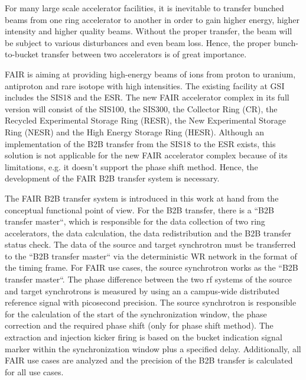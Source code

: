 For many large scale accelerator facilities, it is inevitable to transfer bunched beams from one ring accelerator to another in order to gain higher energy, higher intensity and higher quality beams. Without the proper transfer, the beam will be subject to various disturbances and even beam loss. Hence, the proper bunch-to-bucket transfer between two accelerators is of great importance. 

FAIR is aiming at providing high-energy beams of ions from proton to uranium, antiproton and rare isotope with high intensities. The existing facility at GSI includes the SIS18 and the ESR. The new FAIR accelerator complex in its full version will consist of the SIS100, the SIS300, the Collector Ring (CR), the Recycled Experimental Storage Ring (RESR), the New Experimental Storage Ring (NESR) and the High Energy Storage Ring (HESR). Although an implementation of the B2B transfer from the SIS18 to the ESR exists, this solution is not applicable for the new FAIR accelerator complex because of its limitations, e.g. it doesn't support the phase shift method. Hence, the development of the FAIR B2B transfer system is necessary.

The FAIR B2B transfer system is introduced in this work at hand from the conceptual functional point of view. For the B2B transfer, there is a “B2B transfer master“, which is responsible for the data collection of two ring accelerators, the data calculation, the data redistribution and the B2B transfer status check. The data of the source and target synchrotron must be transferred to the “B2B transfer master“ via the deterministic WR network in the format of the timing frame. For FAIR use cases, the source synchrotron works as the ``B2B transfer master``. The phase difference between the two rf systems of the source and target synchrotrons is measured by using an a campus-wide distributed reference signal with picosecond precision. The source synchrotron is responsible for the calculation of the start of the synchronization window, the phase correction and the required phase shift (only for phase shift method). The extraction and injection kicker firing is based on the bucket indication signal marker within the synchronization window plus a specified delay. Additionally, all FAIR use cases are analyzed and the precision of the B2B transfer is calculated for all use cases. 

